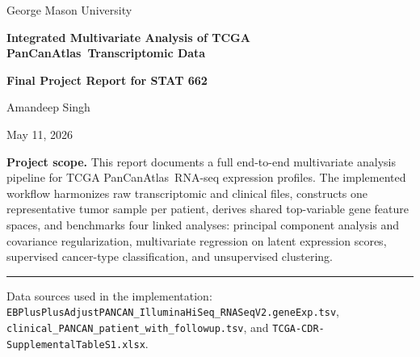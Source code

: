 \documentclass[11pt]{article}
\newcommand{\tcga}{TCGA PanCanAtlas}
\begin{document}
\hypersetup{pageanchor=false}

\begin{titlepage}
\centering
\vspace*{1.8cm}
{\Large\color{ReportGreen}George Mason University\par}
\vspace{0.5cm}
{\LARGE\bfseries\color{ReportBlue}Integrated Multivariate Analysis of \tcga\ Transcriptomic Data\par}
\vspace{0.35cm}
{\large\bfseries Final Project Report for STAT 662\par}
\vspace{1.1cm}
{\large Amandeep Singh\par}
\vspace{0.15cm}
{\normalsize May 11, 2026\par}
\vfill
\begin{minipage}{0.9\textwidth}
\small
\textbf{Project scope.} This report documents a full end-to-end multivariate analysis pipeline for \tcga\ RNA-seq expression profiles. The implemented workflow harmonizes raw transcriptomic and clinical files, constructs one representative tumor sample per patient, derives shared top-variable gene feature spaces, and benchmarks four linked analyses: principal component analysis and covariance regularization, multivariate regression on latent expression scores, supervised cancer-type classification, and unsupervised clustering.
\end{minipage}
\vfill
\rule{0.86\textwidth}{0.8pt}\par
\vspace{0.25cm}
{\small Data sources used in the implementation: \texttt{EBPlusPlusAdjustPANCAN\_IlluminaHiSeq\_RNASeqV2.geneExp.tsv}, \texttt{clinical\_PANCAN\_patient\_with\_followup.tsv}, and \texttt{TCGA-CDR-SupplementalTableS1.xlsx}. \par}
\end{titlepage}
\clearpage
\hypersetup{pageanchor=true}
\end{document}
